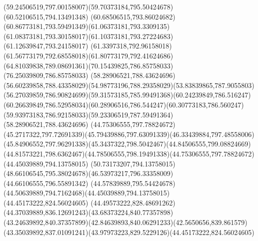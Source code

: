 {{\curveto(59.24506519,797.00158007)(59.70373184,795.50424678)(60.52106515,794.13491348)
\curveto(60.68506515,793.86024682)(60.86773181,793.59491349)(61.06373181,793.3309135)
\curveto(61.08373181,793.30158017)(61.10373181,793.27224683)(61.12639847,793.24158017)
\curveto(61.3397318,792.96158018)(61.56773179,792.68558018)(61.80773179,792.41624686)
\curveto(64.81039838,789.08691361)(70.15439825,786.85758033)(76.25039809,786.85758033)
\moveto(58.28906521,788.43624696)
\curveto(56.60239858,788.43358029)(54.98773196,788.29358029)(53.83839865,787.9055803)
\curveto(56.27039859,786.90824699)(59.31573185,785.99491368)(60.24239849,786.516247)
\curveto(60.26639849,786.52958034)(60.28906516,786.544247)(60.30773183,786.560247)
\curveto(59.93973183,786.92158033)(59.23306519,787.59491364)(58.28906521,788.43624696)
\moveto(44.75306555,797.78824672)
\curveto(45.2717322,797.72691339)(45.79439886,797.63091339)(46.33439884,797.48558006)
\curveto(45.84906552,797.96291338)(45.3437322,798.5042467)(44.84506555,799.08824669)
\curveto(44.81573221,798.6362467)(44.78506555,798.19491338)(44.75306555,797.78824672)
\moveto(44.45039889,794.13758015)
\lineto(50.73173207,794.13758015)
\curveto(48.66106545,795.38024678)(46.53973217,796.33358009)(44.66106555,796.55891342)
\curveto(44.57839889,795.54424678)(44.50639889,794.7162468)(44.45039889,794.13758015)
\moveto(44.45173222,824.56024605)
\curveto(44.49573222,828.48691262)(44.37039889,836.12691243)(43.68373224,840.77357898)
\curveto(43.24639892,840.37357899)(42.84639893,840.06291233)(42.5650656,839.861579)
\curveto(43.35039892,837.01091241)(43.97973223,829.5229126)(44.45173222,824.56024605)
}
}

